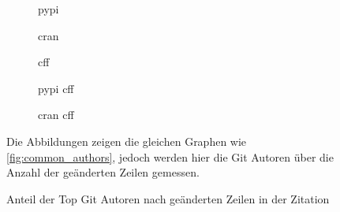 \begin{figure}
    \begin{subfigure}{.5\textwidth}
        \centering
        
        \caption{\gls{pypi}}
        \label{fig:common_authors_by_files_pypi}
    \end{subfigure}%
    \begin{subfigure}{.5\textwidth}
        \centering
        
        \caption{\gls{cran}}
        \label{fig:common_authors_by_files_cran}
    \end{subfigure}
    \begin{subfigure}{.5\textwidth}
        \centering
        
        \caption{\gls{cff}}
        \label{fig:common_authors_by_files_cff}
    \end{subfigure}%
    \begin{subfigure}{.5\textwidth}
        \centering
        
        \caption{\gls{pypi} \gls{cff}}
        \label{fig:common_authors_by_files_pypi_cff}
    \end{subfigure}
    \centering
    \begin{subfigure}{.5\textwidth}
        \centering
        
        \caption{\gls{cran} \gls{cff}}
        \label{fig:common_authors_by_files_cran_cff}
    \end{subfigure}
    \caption{Anteil der Top Git Autoren nach geänderten Zeilen in der Zitation}
    \label{fig:common_authors_by_files}
    \small
    Die Abbildungen zeigen die gleichen Graphen wie \autoref{fig:common_authors}, jedoch werden hier die Git Autoren über die Anzahl der geänderten Zeilen gemessen.
\end{figure}

